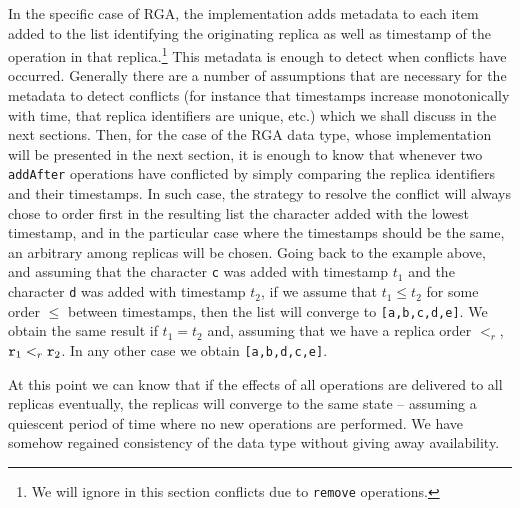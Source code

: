 In the specific case of RGA, the implementation adds metadata to each
item added to the list identifying the originating replica as well as
timestamp of the operation in that replica.\footnote{We will ignore in
  this section conflicts due to \lstinline|remove| operations.}
%
This metadata is enough to detect when conflicts have occurred.
%
Generally there are a number of assumptions that are necessary for the
metadata to detect conflicts (for instance that timestamps increase
monotonically with time, that replica identifiers are unique, etc.)
which we shall discuss in the next sections.
%
Then, for the case of the RGA data type, whose implementation will be
presented in the next section, it is enough to know that whenever
two \lstinline|addAfter| operations have conflicted by simply
comparing the replica identifiers and their timestamps.
%
In such case, the strategy to resolve the conflict will always chose
to order first in the resulting list the character added with the
lowest timestamp, and in the particular case where the timestamps
should be the same, an arbitrary among replicas will be chosen.
%
Going back to the example above, and assuming that the character
\lstinline|c| was added with timestamp $t_1$ and the character
\lstinline|d| was added with timestamp $t_2$, if we assume that $t_1 \leq
t_2$ for some order $\leq$ between timestamps, then the list will
converge to \lstinline|[a,b,c,d,e]|.
%
We obtain the same result if $t_1 = t_2$ and, assuming that we have a replica
order $<_r$, $\mathtt{r}_1 <_r \mathtt{r}_2$.
%
In any other case we obtain \lstinline|[a,b,d,c,e]|.

At this point we can know that if the effects of all operations are
delivered to all replicas eventually, the replicas will converge to
the same state -- assuming a quiescent period of time where no new
operations are performed.
%
We have somehow regained consistency of the data type without
giving away availability.

